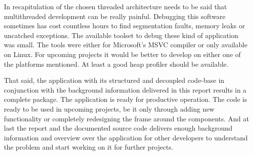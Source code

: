 In recapitulation of the chosen threaded architecture needs to be said that multithreaded development can be really painful. Debugging this software sometimes has cost countless hours to find segmentation faults, memory leaks or uncatched exceptions. The available toolset to debug these kind of application was small. The tools were either for Microsoft's MSVC compiler or only available on Linux. For upcoming projects it would be better to develop on either one of the platforms mentioned. At least a good heap profiler should be available.

That said, the application with its structured and decoupled code-base in conjunction with the background information delivered in this report results in a complete package. The application is ready for productive operation. The code is ready to be used in upcoming projects, be it only through adding new functionality or completely redesigning the frame around the components. And at last the report and the documented source code delivers enough background information and overview over the application for other developers to understand the problem and start working on it for further projects.  

